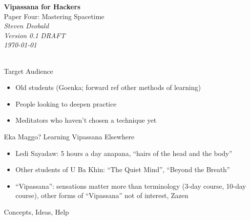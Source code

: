 \documentclass{article}
\begin{document}
\begin{titlepage}
   \begin{center}
     \Huge\textbf{Vipassana for Hackers}\\
     \Huge{Paper Four: Mastering Spacetime}\\
     \vspace{5cm}
     \large\textit{Steven Deobald}\\
     \large\textit{Version 0.1 DRAFT}\\
     \large\textit\today\\
     \vspace{5cm}
     \large\textit{}\\
   \end{center}
\end{titlepage}

\begin{center}
  \Huge{Target Audience}
\end{center}

\begin{itemize}
  \item Old students (Goenka; forward ref other methods of learning)
  \item People looking to deepen practice
  \item Meditators who haven't chosen a technique yet
\end{itemize}

\pagebreak

\begin{center}
  \Huge{Eka Maggo? Learning Vipassana Elsewhere}
\end{center}

\begin{itemize}
  \item Ledi Sayadaw: 5 hours a day anapana, ``hairs of the head and the body''
  \item Other students of U Ba Khin: ``The Quiet Mind'', ``Beyond the Breath''
  \item ``Vipassana'': sensations matter more than terminology (3-day course, 10-day course), other forms of ``Vipassana'' not of interest, Zazen
\end{itemize}

\pagebreak

\begin{center}
  \Huge{Concepts, Ideas, Help}
\end{center}
\end{document}

